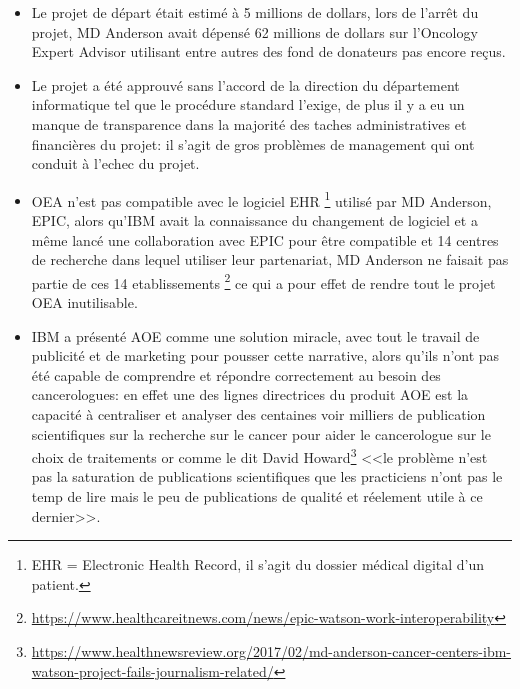 \begin{itemize}
    \item Le projet de départ était estimé à 5 millions de dollars, lors de l'arrêt du
    projet, MD Anderson avait dépensé 62 millions de dollars sur l'Oncology
    Expert Advisor utilisant entre autres des fond de donateurs pas encore reçus. \newline

    \item Le projet a été approuvé sans l'accord de la direction du
    département informatique tel que le procédure standard l'exige, de plus il y a
    eu un manque de transparence dans la majorité des taches administratives et
    financières du projet: il s'agit de gros problèmes de management qui ont conduit
    à l'echec du projet.\newline

    \item OEA n'est pas compatible avec le logiciel EHR
    \footnote{
        EHR = Electronic Health Record, il s'agit du dossier médical digital d'un patient.
    } utilisé par MD Anderson, EPIC, alors qu'IBM avait la connaissance du changement
    de logiciel et a même lancé une collaboration avec EPIC pour être compatible
    et 14 centres de recherche dans lequel utiliser leur partenariat,
    MD Anderson ne faisait pas partie de ces 14 etablissements
    \footnote{
        \url{https://www.healthcareitnews.com/news/epic-watson-work-interoperability}
    } ce qui a pour effet de rendre tout le projet OEA inutilisable.
    \newline

    \item IBM a présenté AOE comme une solution miracle, avec tout le travail
    de publicité et de marketing pour pousser cette narrative, alors qu'ils n'ont
    pas été capable de comprendre et répondre correctement au besoin des cancerologues:
    en effet une des lignes directrices du produit AOE est la capacité à centraliser
    et analyser des centaines voir milliers de publication scientifiques sur la
    recherche sur le cancer pour aider le cancerologue sur le choix de traitements
    or comme le dit David Howard\footnote{\url{https://www.healthnewsreview.org/2017/02/md-anderson-cancer-centers-ibm-watson-project-fails-journalism-related/}}
    <<le problème n'est pas la saturation de publications scientifiques
    que les practiciens n'ont pas le temp de lire mais le peu de publications
    de qualité et réelement utile à ce dernier>>. \newline
\end{itemize}

